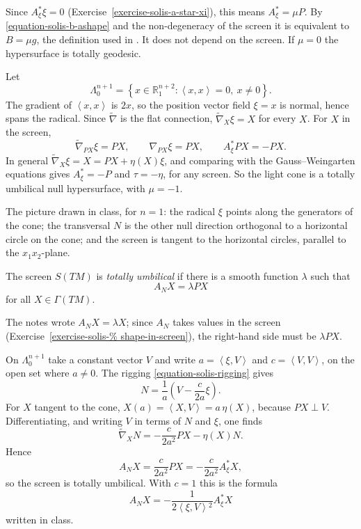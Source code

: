 \noindent
Since $A^*_{\xi}\xi=0$
(Exercise~\ref{exercise-solis-a-star-xi}),
this means $A^*_{\xi}=\mu P$. By
\eqref{equation-solis-b-ashape} and the
non-degeneracy of the screen it is
equivalent to $B=\mu g$, the definition
used in \cite{navarro2020screen}. It does
not depend on the screen. If $\mu=0$ the
hypersurface is totally geodesic.

\begin{example}
\label{example-solis-light-cone}
Let
$$
\Lambda^{n+1}_0=\left\{x\in
\mathbb{R}^{n+2}_1:
\left\langle{} x,x \right\rangle{}=0,\
x\neq 0\right\}.
$$
The gradient of
$\left\langle{} x,x \right\rangle{}$ is
$2x$, so the position vector field
$\xi=x$ is normal, hence spans the
radical. Since $\widetilde{\nabla}$ is the
flat connection,
$\widetilde{\nabla}_X\xi=X$ for every
$X$. For $X$ in the screen,
$$
\widetilde{\nabla}_{PX}\xi=PX,\qquad
\nabla_{PX}\xi=PX,\qquad
A^*_{\xi}PX=-PX.
$$
In general
$\widetilde{\nabla}_X\xi=X=PX+\eta(X)\xi$,
and comparing with the Gauss--Weingarten
equations gives $A^*_{\xi}=-P$ and
$\tau=-\eta$, for any screen. So the light
cone is a totally umbilical null
hypersurface, with $\mu=-1$.

The picture drawn in class, for
$n=1$: the radical $\xi$ points along the
generators of the cone; the transversal
$N$ is the other null direction
orthogonal to a horizontal circle on the
cone; and the screen is tangent to the
horizontal circles, parallel to the
$x_1x_2$-plane.
\end{example}

\begin{definition}
\label{definition-solis-screen-umbilical}
The screen $S(TM)$ is \emph{totally
umbilical} if there is a smooth function
$\lambda$ such that
$$
A_NX=\lambda PX
$$
for all $X\in\Gamma(TM)$.
\end{definition}

\noindent
The notes wrote $A_NX=\lambda X$; since
$A_N$ takes values in the screen
(Exercise~\ref{exercise-solis-%
shape-in-screen}),
the right-hand side must be $\lambda PX$.

\begin{example}
\label{example-solis-light-cone-screen}
On $\Lambda^{n+1}_0$ take a constant
vector $V$ and write
$a=\left\langle{} \xi,V \right\rangle{}$
and
$c=\left\langle{} V,V \right\rangle{}$,
on the open set where $a\neq 0$. The
rigging \eqref{equation-solis-rigging}
gives
$$
N=\frac{1}{a}\left(V-\frac{c}{2a}\xi
\right).
$$
For $X$ tangent to the cone,
$X(a)=\left\langle{} X,V \right\rangle{}
=a\,\eta(X)$, because $PX\perp V$.
Differentiating, and writing $V$ in terms
of $N$ and $\xi$, one finds
$$
\widetilde{\nabla}_XN
=-\frac{c}{2a^2}PX-\eta(X)N.
$$
Hence
$$
A_NX=\frac{c}{2a^2}PX
=-\frac{c}{2a^2}A^*_{\xi}X,
$$
so the screen is totally umbilical. With
$c=1$ this is the formula
$$
A_NX=-\frac{1}{2\left\langle{} \xi,V
\right\rangle{}^2}A^*_{\xi}X
$$
written in class.
\end{example}

